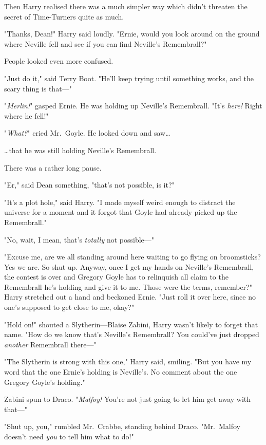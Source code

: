 Then Harry realised there was a much simpler way which didn't threaten the
secret of Time-Turners quite as much.

"Thanks, Dean!" Harry said loudly. "Ernie, would you look around on the ground
where Neville fell and see if you can find Neville's Remembrall?"

People looked even more confused.

"Just do it," said Terry Boot. "He'll keep trying until something works, and
the scary thing is that---"

"\emph{Merlin!}" gasped Ernie. He was holding up Neville's Remembrall. "It's
\emph{here!} Right where he fell!"

"\emph{What?}" cried Mr.~Goyle. He looked down and saw{\ldots}

{\ldots}that he was still holding Neville's Remembrall.

There was a rather long pause.

"Er," said Dean something, "that's not possible, is it?"

"It's a plot hole," said Harry. "I made myself weird enough to distract the
universe for a moment and it forgot that Goyle had already picked up the
Remembrall."

"No, wait, I mean, that's \emph{totally} not possible---"

"Excuse me, are we all standing around here waiting to go flying on
broomsticks? Yes we are. So shut up. Anyway, once I get my hands on Neville's
Remembrall, the contest is over and Gregory Goyle has to relinquish all claim
to the Remembrall he's holding and give it to me. Those were the terms,
remember?" Harry stretched out a hand and beckoned Ernie. "Just roll it over
here, since no one's supposed to get close to me, okay?"

"Hold on!" shouted a Slytherin---Blaise Zabini, Harry wasn't likely to forget
that name. "How do we know that's Neville's Remembrall? You could've just
dropped \emph{another} Remembrall there---"

"The Slytherin is strong with this one," Harry said, smiling. "But you have my
word that the one Ernie's holding is Neville's. No comment about the one
Gregory Goyle's holding."

Zabini spun to Draco. "\emph{Malfoy!} You're not just going to let him get away
with that---"

"Shut up, you," rumbled Mr.~Crabbe, standing behind Draco. "Mr.~Malfoy doesn't
need \emph{you} to tell him what to do!"

